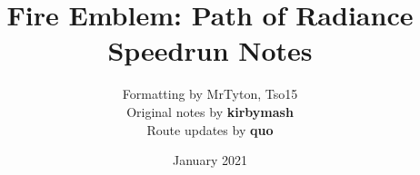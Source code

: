 \documentclass[a4paper]{report}
\title{Fire Emblem: Path of Radiance Speedrun Notes}
\author{Formatting by MrTyton, Tso15
\\ Original notes by \textbf{kirbymash}
\\ Route updates by \textbf{quo}}
\date{January 2021}
\begin{document}
\singlespacing
\maketitle
\makeatletter
\patchcmd{\chapter}{\if@openright\cleardoublepage\else\clearpage\fi}{}{}{}
\makeatother


\newenvironment{battlespecial}[1]{\begin{tcolorbox}[title=\begin{center}#1\end{center},colbacktitle=blue!50!white]}{\end{tcolorbox}}
\newenvironment{battle}[1]{\refstepcounter{chaptercount} \begin{tcolorbox}[title=\begin{center}Chapter \thechaptercount\ - #1\end{center},colbacktitle=blue!50!white]}{\end{tcolorbox}}


\newcommand{\battleinfo}[3]{Goal: \ifthenelse{\equal{#1}{rout}}{Rout the Enemy}{\ifthenelse{\equal{#1}{boss}}{Defeat the Boss}{#1}} \newline Turns: #2 \newline Units: #3}


\newenvironment{shop}[1]{\begin{tcolorbox}[title=\begin{center}SHOP\, #1 GOLD\end{center},colbacktitle=green!50!white]}{\end{tcolorbox}}

\newcommand{\cs}[1][]{\textbf{CS}%
	\ifthenelse{\isempty{#1}}{}{ (#1)}%
}

\end{document}
